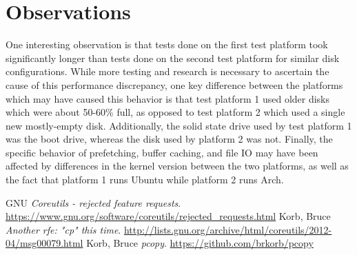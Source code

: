 \documentclass[12pt]{article}
\begin{document}
\section{Observations}
One interesting observation is that tests done on the first test platform took significantly longer
than tests done on the second test platform for similar disk configurations. While more testing and
research is necessary to ascertain the cause of this performance discrepancy, one key difference between
the platforms which may have caused this behavior is that test platform 1 used older disks which were
about 50-60\% full, as opposed to test platform 2 which used a single new mostly-empty disk. Additionally,
the solid state drive used by test platform 1 was the boot drive, whereas the disk used by platform 2
was not. Finally, the specific behavior of prefetching, buffer caching, and file IO may have been affected by differences
in the kernel version between the two platforms, as well as the fact that platform 1 runs Ubuntu while platform 2 runs Arch. \\

\begin{thebibliography}{9}
    GNU
    \emph{Coreutils - rejected feature requests}.
    \url{https://www.gnu.org/software/coreutils/rejected_requests.html}
    Korb, Bruce
    \emph{Another rfe: "cp" this time}.
    \url{http://lists.gnu.org/archive/html/coreutils/2012-04/msg00079.html}
    Korb, Bruce
    \emph{pcopy}.
    \url{https://github.com/brkorb/pcopy}
\end{thebibliography}
\end{document}
